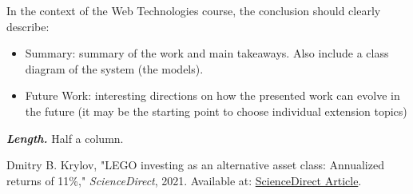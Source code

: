\documentclass[letterpaper,twocolumn]{article}
\newcommand{\myparagraph}[1]{\vspace{0.1cm}\noindent \textbf{\textit{#1.}}}
\begin{document}
In the context of the Web Technologies course, the conclusion should clearly describe:

\begin{itemize}
    \item Summary: summary of the work and main takeaways. Also include a class diagram of the system (the models).
    \item Future Work: interesting directions on how the presented work can evolve in the future (it may be the starting point to choose individual extension topics)
\end{itemize}

\myparagraph{Length} Half a column.

\begin{thebibliography}{9}

    Dmitry B. Krylov, "LEGO investing as an alternative asset class: Annualized returns of 11\%," 
    \textit{ScienceDirect}, 2021. Available at: \href{https://www.sciencedirect.com/science/article/abs/pii/S0275531921001604?via%3Dihub}{ScienceDirect Article}.
    
\end{thebibliography}
\end{document}
